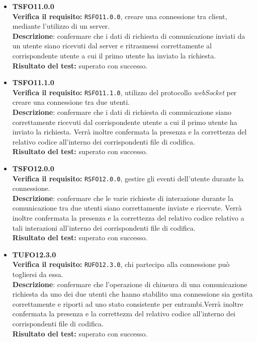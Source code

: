 \begin{itemize}
\item \textbf{TSFO11.0.0}\\
\textbf{Verifica il requisito:} \texttt{RSFO11.0.0}, creare una connessione tra client, mediante l'utilizzo di un server.\\
\textbf{Descrizione}: confermare che i dati di richiesta di comunicazione inviati da un utente  siano ricevuti dal server e ritrasmessi correttamente al corrispondente utente  a cui il primo utente ha inviato la richiesta.\\
\textbf{Risultato del test:} superato con successo.

\item \textbf{TSFO11.1.0}\\
\textbf{Verifica il requisito:} \texttt{RSFO11.1.0}, utilizzo del protocollo \textit{webSocket} per creare una connessione tra due utenti.\\
\textbf{Descrizione}: confermare che i dati di richiesta di comunicazione siano correttamente ricevuti dal corrispondente utente  a cui il primo utente ha inviato la richiesta. Verrà inoltre confermata la presenza e la correttezza  del relativo codice all'interno dei corrispondenti file di codifica.\\
\textbf{Risultato del test:} superato con successo.

\item \textbf{TSFO12.0.0}\\
\textbf{Verifica il requisito:} \texttt{RSFO12.0.0}, gestire gli eventi dell'utente durante la connessione.\\
\textbf{Descrizione}: confermare che le varie richieste di interazione durante la comunicazione tra due utenti  siano correttamente inviate e ricevute. Verrà inoltre confermata la presenza e la correttezza del relativo codice relativo a tali interazioni all'interno dei corrispondenti file di codifica.\\
\textbf{Risultato del test:} superato con successo.

\item \textbf{TUFO12.3.0}\\
\textbf{Verifica il requisito:} \texttt{RUFO12.3.0}, chi partecipa alla connessione può togliersi da essa.\\
\textbf{Descrizione}: confermare che l'operazione di chiusura di una comunicazione richiesta da uno dei due utenti  che hanno stabilito una connessione sia gestita correttamente e riporti ad uno stato consistente per entrambi.Verrà inoltre confermata la presenza e la correttezza del relativo codice all'interno dei corrispondenti file di codifica.\\
\textbf{Risultato del test:} superato con successo.


\end{itemize}
